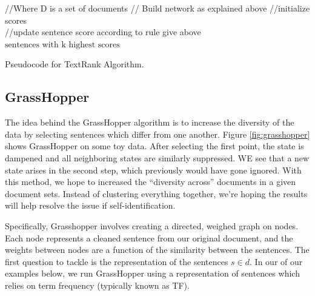 \documentclass[11pt]{article}
\begin{document}
\begin{algorithm}
  \begin{algorithmic}
     //Where D is a set of documents
     // Build network as explained above
     //initialize scores
     \\
     \indent  \indent //update sentence score according to rule give above
      \EndIf
     \EndFor
     \EndWhile
 \Return $\text{sentences with k highest scores}$

    \EndProcedure{}
  \end{algorithmic}
  \caption{Pseudocode for TextRank Algorithm.}
\end{algorithm}

\subsection{GrassHopper}
The idea behind the {\sc GrassHopper} algorithm is to increase the diversity of the data by selecting sentences which differ from one another. Figure \ref{fig:grasshopper} shows {\sc GrassHopper} on some toy data. After selecting the first point, the state is dampened and all neighboring states are similarly suppressed. WE see that a new state arises in the second step, which previously would have gone ignored. With this method, we hope to increased the ``diversity across'' documents in a given document sets. Instead of clustering everything together, we're hoping the results will help resolve the issue if self-identification.

Specifically, Grasshopper involves creating a directed, weighed graph on  nodes. Each node represents a cleaned sentence from our original document, and the weights between nodes are a function of the similarity between the sentences. The first question to tackle is the representation of the sentences $s \in d$. In our of our examples below, we run {\sc GrassHopper} using a representation of sentences which relies on term frequency (typically known as TF). \\
\end{document}
